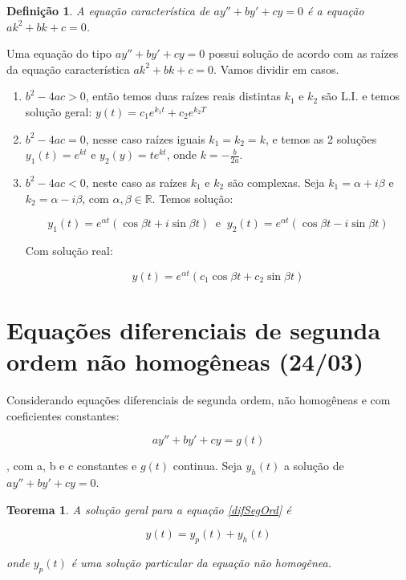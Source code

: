 \documentclass[12pt]{article}
\newtheorem{theorem}{Teorema}[section]
\newtheorem{definition}{Definição}
\begin{document}
\begin{definition}
    A equação característica de $ay'' + by' + cy = 0$ é a equação $a k^2 + b k + c = 0$.
\end{definition}

Uma equação do tipo $ay'' + by' + cy = 0$ possui solução de acordo com as raízes da equação característica $a k^2 + b k + c = 0$. Vamos dividir em casos.

\begin{enumerate}
    \item $b^2 - 4 a c > 0$, então temos duas raízes reais distintas $k_1$ e $k_2$ são L.I. e temos solução geral: $y(t) = c_1 e^{k_1 t} + c_2 e^{k_2 T}$
    \item $b^2 - 4 a c = 0$, nesse caso raízes iguais $k_1 = k_2 = k$, e temos as 2 soluções $y_1(t) = e^{k t}$ e $y_2(y) = t e^{k t}$, onde $k = - \frac{b}{2 a}$.
    \item $b^2 - 4 a c < 0$, neste caso as raízes $k_1$ e $k_2$ são complexas. Seja $k_1 = \alpha + i \beta$ e $k_2 = \alpha - i \beta$, com $\alpha, \beta \in \mathbb{R}$. Temos solução:
    
    $$y_1(t) = e^{\alpha t} (\cos \beta t +  i\sin \beta t) \ \text{ e } \ y_2(t) = e^{\alpha t} (\cos \beta t -  i\sin \beta t)$$
    
    Com solução real:
    
    $$y(t) = e^{\alpha t} (c_1 \cos \beta t + c_2 \sin \beta t)$$
\end{enumerate}

\section{Equações diferenciais de segunda ordem não homogêneas (24/03)}

Considerando equações diferenciais de segunda ordem, não homogêneas e com coeficientes constantes: 

\begin{equation}\label{difSegOrd}
ay'' + b y' + c y = g(t)
\end{equation}

, com a, b e c constantes e $g(t)$ continua. Seja $y_h(t)$ a solução de $ay'' + b y' + c y = 0$.

\begin{theorem}
    A solução geral para a equação \ref{difSegOrd} é 
    
    $$y(t) = y_p (t) + y_h (t)$$
    
    onde $y_p(t)$ é uma solução particular da equação não homogênea.
\end{theorem}
\end{document}
